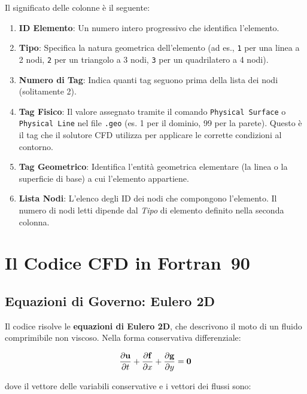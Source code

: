 Il significato delle colonne è il seguente:
\begin{enumerate}
  \item \textbf{ID Elemento}: Un numero intero progressivo che identifica l'elemento.
  \item \textbf{Tipo}: Specifica la natura geometrica dell'elemento (ad es., \texttt{1} per una linea a 2 nodi, \texttt{2} per un triangolo a 3 nodi, \texttt{3} per un quadrilatero a 4 nodi).
  \item \textbf{Numero di Tag}: Indica quanti tag seguono prima della lista dei nodi (solitamente 2).
  \item \textbf{Tag Fisico}: Il valore assegnato tramite il comando \texttt{Physical Surface} o \texttt{Physical Line} nel file \texttt{.geo} (es. 1 per il dominio, 99 per la parete). Questo è il tag che il solutore CFD utilizza per applicare le corrette condizioni al contorno.
  \item \textbf{Tag Geometrico}: Identifica l'entità geometrica elementare (la linea o la superficie di base) a cui l'elemento appartiene.
  \item \textbf{Lista Nodi}: L'elenco degli ID dei nodi che compongono l'elemento. Il numero di nodi letti dipende dal \emph{Tipo} di elemento definito nella seconda colonna.
\end{enumerate}
\section{Il Codice CFD in Fortran~90}
\label{sec:codice_cfd}

\subsection{Equazioni di Governo: Eulero 2D}

Il codice risolve le \textbf{equazioni di Eulero 2D}, che descrivono il moto di un fluido
comprimibile non viscoso. Nella forma conservativa differenziale:

\begin{equation}
  \dfrac{\partial \mathbf{u}}{\partial t}
  + \dfrac{\partial \mathbf{f}}{\partial x}
  + \dfrac{\partial \mathbf{g}}{\partial y} = \bm{0}
  \label{eq:eulero_diff}
\end{equation}

dove il vettore delle variabili conservative e i vettori dei flussi sono:

